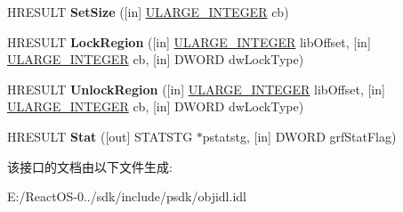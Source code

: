 \begin{DoxyCompactItemize}
\item 
\mbox{\label{interface_i_lock_bytes_aba92bd4a94a5cb023b6229307acd6006}} 
H\+R\+E\+S\+U\+LT {\bfseries Set\+Size} (\mbox{[}in\mbox{]} \hyperlink{struct___u_l_a_r_g_e___i_n_t_e_g_e_r}{U\+L\+A\+R\+G\+E\+\_\+\+I\+N\+T\+E\+G\+ER} cb)
\item 
\mbox{\label{interface_i_lock_bytes_a8f8c8ed36a346048231c48354f8accc8}} 
H\+R\+E\+S\+U\+LT {\bfseries Lock\+Region} (\mbox{[}in\mbox{]} \hyperlink{struct___u_l_a_r_g_e___i_n_t_e_g_e_r}{U\+L\+A\+R\+G\+E\+\_\+\+I\+N\+T\+E\+G\+ER} lib\+Offset, \mbox{[}in\mbox{]} \hyperlink{struct___u_l_a_r_g_e___i_n_t_e_g_e_r}{U\+L\+A\+R\+G\+E\+\_\+\+I\+N\+T\+E\+G\+ER} cb, \mbox{[}in\mbox{]} D\+W\+O\+RD dw\+Lock\+Type)
\item 
\mbox{\label{interface_i_lock_bytes_af075e9d6b141c020647425949b489510}} 
H\+R\+E\+S\+U\+LT {\bfseries Unlock\+Region} (\mbox{[}in\mbox{]} \hyperlink{struct___u_l_a_r_g_e___i_n_t_e_g_e_r}{U\+L\+A\+R\+G\+E\+\_\+\+I\+N\+T\+E\+G\+ER} lib\+Offset, \mbox{[}in\mbox{]} \hyperlink{struct___u_l_a_r_g_e___i_n_t_e_g_e_r}{U\+L\+A\+R\+G\+E\+\_\+\+I\+N\+T\+E\+G\+ER} cb, \mbox{[}in\mbox{]} D\+W\+O\+RD dw\+Lock\+Type)
\item 
\mbox{\label{interface_i_lock_bytes_a36909ceb41bab2bcbd75f4afbc36f6d7}} 
H\+R\+E\+S\+U\+LT {\bfseries Stat} (\mbox{[}out\mbox{]} S\+T\+A\+T\+S\+TG $\ast$pstatstg, \mbox{[}in\mbox{]} D\+W\+O\+RD grf\+Stat\+Flag)
\end{DoxyCompactItemize}


该接口的文档由以下文件生成\+:\begin{DoxyCompactItemize}
\item 
E\+:/\+React\+O\+S-\/0../sdk/include/psdk/objidl.\+idl\end{DoxyCompactItemize}
